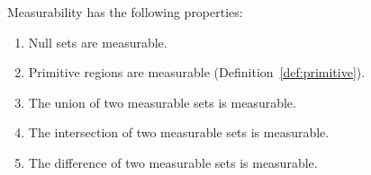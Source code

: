 \begin{lemma}[measurable]\label{lemma:measurable}
Measurability has the following  properties:
\begin{enumerate}%
\item Null sets are measurable.
\item Primitive regions are measurable (Definition~\ref{def:primitive}).
\item The union of two measurable sets is measurable.
\item The intersection of two measurable sets is measurable.
\item The difference of two measurable sets is measurable.
\label{enum:measure}
%
%
%
\end{enumerate}
\end{lemma}


